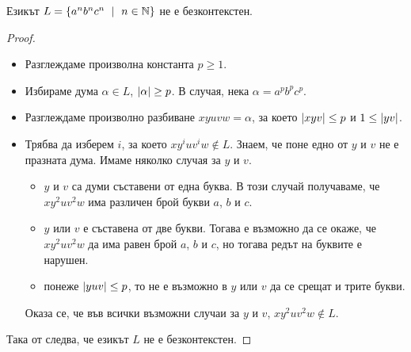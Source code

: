 \begin{example}
  \label{example:anbncn}
  Езикът $L = \{a^nb^nc^n\ \mid\ n\in\mathbb{N}\}$ не е безконтекстен.
\end{example}
\begin{proof}
  \begin{itemize}
  \item 
    Разглеждаме произволна константа $p \geq 1$.
  \item
    Избираме дума $\alpha \in L$, $\lvert{\alpha}\rvert \geq p$.
    В случая, нека $\alpha = a^pb^pc^p$.
  \item
    Разглеждаме произволно разбиване $xyuvw = \alpha$, за което $\lvert{xyv}\rvert \leq p$ и $1 \leq \lvert{yv}\rvert$.
  \item
    Трябва да изберем $i$, за което $xy^iuv^iw \not\in L$.
    Знаем, че поне едно от $y$ и $v$ не е празната дума.
    Имаме няколко случая за $y$ и $v$.
    \begin{itemize}
    \item
      $y$ и $v$ са думи съставени от една буква.
      В този случай получаваме, че $xy^2uv^2w$ има различен брой букви $a$, $b$ и $c$.
    \item
      $y$ или $v$ е съставена от две букви.
      Тогава е възможно да се окаже, че $xy^2uv^2w$ да има равен брой $a$, $b$ и $c$,
      но тогава редът на буквите е нарушен.
    \item
      понеже $\lvert{yuv}\rvert \leq p$, то не е възможно в $y$ или $v$ да се срещат и трите букви.
    \end{itemize}  
    Оказа се, че във всички възможни случаи за $y$ и $v$, 
    $xy^2uv^2w \not\in L$.
  \end{itemize}
  Така от  следва, че езикът $L$ не е безконтекстен.
\end{proof}


